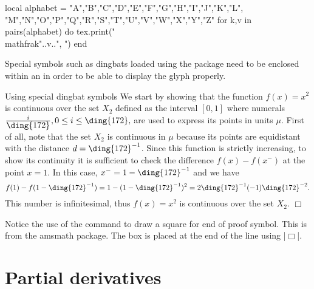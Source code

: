 {{{\begin{luacode}
local alphabet = {"A","B","C","D","E","F","G","H","I","J","K","L",
                  "M","N","O","P","Q","R","S","T","U","V","W","X","Y","Z"}
for k,v in pairs(alphabet) do
	tex.print("\\mathfrak{"..v.."}, ")
end
\end{luacode}

Special symbols such as dingbats loaded using the  package need to be enclosed within an  in order to be able to display the glyph properly.
\bigskip

\begin{texexample}{Using special dingbat symbols}{}
\label{e14}
 We start by showing that the function $f(x)=x^2$ is
continuous over the set $X_2$\label{p:X2} defined as the interval
$[0,1]$ where numerals $\frac{i}{\mbox{\ding{172}}}, 0 \le i \le
\mbox{\ding{172}},$ are used to express its points in units $\mu$.
First of all, note that the set $X_2$ is continuous in   $\mu$
because its points are equidistant with the distance
$d=\mbox{\ding{172}}^{-1}$. Since this function is strictly
increasing,  to show its continuity it is sufficient to check the
difference $f(x)-f(x^{-})$ at the point $x=1$. In this case,
$x^{-}=1-\mbox{\ding{172}}^{-1}$ and we have
\[
 f(1)-f(1-\mbox{\ding{172}}^{-1})=
 1-(1-\mbox{\ding{172}}^{-1})^2 =
 2\mbox{\ding{172}}^{-1}(-1)\mbox{\ding{172}}^{-2}.
\]
This number is infinitesimal, thus $f(x)=x^2$ is continuous over
the set $X_2$. \hfill $\Box$
\end{texexample}

Notice the use of the  command to draw a square for  end of proof symbol. This is from the amsmath package. The box is placed at the end of the line using |\hfill $\Box$|.

%
%



\section{Partial derivatives}

}}}
